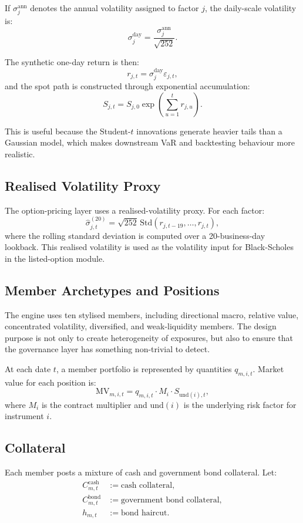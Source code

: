 \documentclass[11pt]{article}
\begin{document}
If \(\sigma_j^{\text{ann}}\) denotes the annual volatility assigned to factor \(j\), the daily-scale volatility is:
\[
\sigma_j^{\text{day}} = \frac{\sigma_j^{\text{ann}}}{\sqrt{252}}.
\]

The synthetic one-day return is then:
\[
r_{j,t} = \sigma_j^{\text{day}} \varepsilon_{j,t},
\]
and the spot path is constructed through exponential accumulation:
\[
S_{j,t} = S_{j,0}\exp\left(\sum_{u=1}^{t} r_{j,u}\right).
\]

This is useful because the Student-\(t\) innovations generate heavier tails than a Gaussian model, which makes downstream VaR and backtesting behaviour more realistic.

\subsection{Realised Volatility Proxy}

The option-pricing layer uses a realised-volatility proxy. For each factor:
\[
\widehat{\sigma}_{j,t}^{(20)} =
\sqrt{252}\,\mathrm{Std}\left(r_{j,t-19},\dots,r_{j,t}\right),
\]
where the rolling standard deviation is computed over a 20-business-day lookback. This realised volatility is used as the volatility input for Black-Scholes in the listed-option module.

\subsection{Member Archetypes and Positions}

The engine uses ten stylised members, including directional macro, relative value, concentrated volatility, diversified, and weak-liquidity members. The design purpose is not only to create heterogeneity of exposures, but also to ensure that the governance layer has something non-trivial to detect.

At each date \(t\), a member portfolio is represented by quantities \(q_{m,i,t}\). Market value for each position is:
\[
\text{MV}_{m,i,t} = q_{m,i,t} \cdot M_i \cdot S_{\text{und}(i),t},
\]
where \(M_i\) is the contract multiplier and \(\text{und}(i)\) is the underlying risk factor for instrument \(i\).

\subsection{Collateral}

Each member posts a mixture of cash and government bond collateral. Let:
\begin{align*}
C_{m,t}^{\text{cash}} &:= \text{cash collateral},\\
C_{m,t}^{\text{bond}} &:= \text{government bond collateral},\\
h_{m,t} &:= \text{bond haircut}.
\end{align*}
\end{document}
